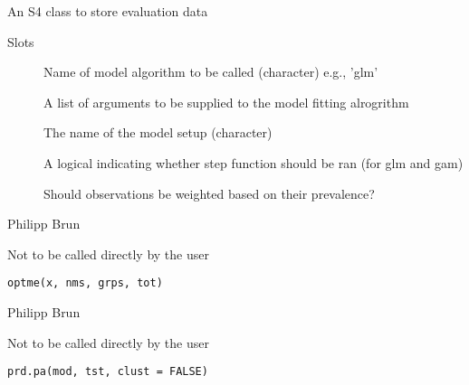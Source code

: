 \documentclass[a4paper]{book}
\begin{document}
%
\begin{Description}\relax
An S4 class to store evaluation data
\end{Description}
%
\begin{Section}{Slots}

\begin{description}

\item[] Name of model algorithm to be called (character) e.g., 'glm'

\item[] A list of arguments to be supplied to the model fitting alrogrithm

\item[] The name of the model setup (character)

\item[] A logical indicating whether step function should be ran (for glm
and gam)

\item[] Should observations be weighted based on their prevalence?

\end{description}
\end{Section}
%
\begin{Author}\relax
Philipp Brun
\end{Author}
%
\begin{Description}\relax
Not to be called directly by the user
\end{Description}
%
\begin{Usage}
\begin{verbatim}
optme(x, nms, grps, tot)
\end{verbatim}
\end{Usage}
%
\begin{Author}\relax
Philipp Brun
\end{Author}
%
\begin{Description}\relax
Not to be called directly by the user
\end{Description}
%
\begin{Usage}
\begin{verbatim}
prd.pa(mod, tst, clust = FALSE)
\end{verbatim}
\end{Usage}
\end{document}
